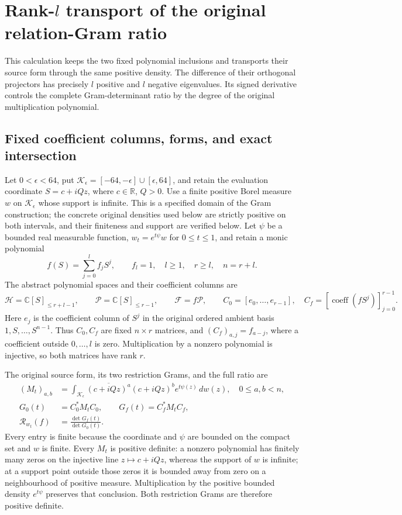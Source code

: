 \section{Rank-$l$ transport of the original relation-Gram ratio}

This calculation keeps the two fixed polynomial inclusions and transports
their source form through the same positive density. The difference of
their orthogonal projectors has precisely $l$ positive and $l$ negative
eigenvalues. Its signed derivative controls the complete Gram-determinant
ratio by the degree of the original multiplication polynomial.

\subsection{Fixed coefficient columns, forms, and exact intersection}
Let $0<\epsilon<64$, put
$\mathcal K_\epsilon=[-64,-\epsilon]\cup[\epsilon,64]$, and retain the
evaluation coordinate $S=c+iQz$, where $c\in\mathbb R$, $Q>0$.
Use a finite positive Borel measure $w$ on $\mathcal K_\epsilon$ whose
support is infinite. This is a specified domain of the Gram construction;
the concrete original densities used below are strictly positive on both
intervals, and their finiteness and support are verified below.
Let $\psi$ be a bounded real measurable function, $w_t=e^{t\psi}w$ for
$0\leq t\leq1$, and retain a monic polynomial
\[
 f(S)=\sum_{j=0}^l f_jS^j,\qquad f_l=1,\quad
 l\geq1,\quad r\geq l,\quad n=r+l.
 \tag{CTR1}
\]
The abstract polynomial spaces and their coefficient columns are
\[
 \mathcal H=\mathbb C[S]_{\leq r+l-1},\qquad
 \mathcal P=\mathbb C[S]_{\leq r-1},\qquad
 \mathcal F=f\mathcal P,\qquad
 C_0=[e_0,\ldots,e_{r-1}],\quad
 C_f=[\operatorname{coeff}(fS^j)]_{j=0}^{r-1}.
 \tag{CTR2}
\]
Here $e_j$ is the coefficient column of $S^j$ in the original ordered
ambient basis $1,S,\ldots,S^{n-1}$. Thus $C_0,C_f$ are fixed $n\times r$
matrices, and $(C_f)_{a,j}=f_{a-j}$, where a coefficient outside $0,\ldots,l$
is zero. Multiplication by a nonzero polynomial is injective, so both
matrices have rank $r$.

The original source form, its two restriction Grams, and the full ratio are
\[
 \begin{split}
 (M_t)_{a,b}&=\int_{\mathcal K_\epsilon}
        \overline{(c+iQz)^a}(c+iQz)^b e^{t\psi(z)}\,dw(z),\quad 0\leq a,b<n,\\
 G_0(t)&=C_0^*M_tC_0,\qquad G_f(t)=C_f^*M_tC_f,\\
 \mathcal R_{w_t}(f)&=\frac{\det G_f(t)}{\det G_0(t)}.
 \end{split}
 \tag{CTR3}
\]
Every entry is finite because the coordinate and $\psi$ are bounded on
the compact set and $w$ is finite. Every $M_t$ is positive definite:
a nonzero polynomial has finitely many zeros on the injective line
$z\mapsto c+iQz$, whereas the support of $w$ is infinite; at a support
point outside those zeros it is bounded away from zero on a neighbourhood
of positive measure. Multiplication by the positive bounded density
$e^{t\psi}$ preserves that conclusion. Both restriction Grams are
therefore positive definite.

